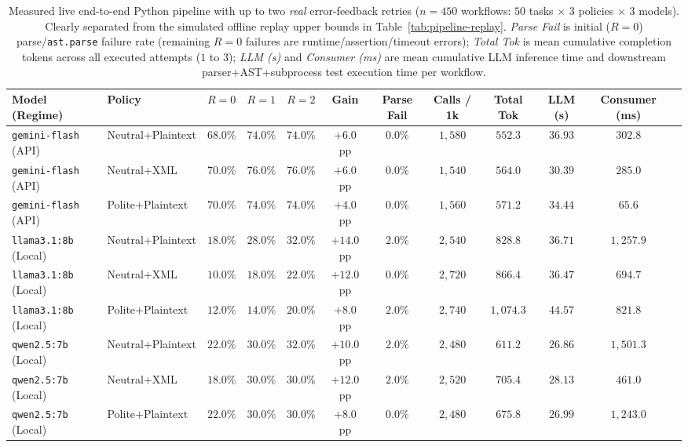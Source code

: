 \documentclass[a4paper,fleqn]{cas-sc}
\begin{document}
\begin{table}[htbp]
\centering
\caption{Measured live end-to-end Python pipeline with up to two \emph{real} error-feedback retries ($n = 450$ workflows: $50$ tasks $\times$ $3$ policies $\times$ $3$ models). Clearly separated from the simulated offline replay upper bounds in Table~\ref{tab:pipeline-replay}. \emph{Parse Fail} is initial ($R=0$) parse/\texttt{ast.parse} failure rate (remaining $R=0$ failures are runtime/assertion/timeout errors); \emph{Total Tok} is mean cumulative completion tokens across all executed attempts ($1$ to $3$); \emph{LLM (s)} and \emph{Consumer (ms)} are mean cumulative LLM inference time and downstream parser+AST+subprocess test execution time per workflow.}\label{tab:live-pipeline-measured}
\footnotesize
\setlength{\tabcolsep}{2.8pt}
\begin{tabular}{@{}llcccccccccc@{}}
\toprule
\textbf{Model (Regime)} & \textbf{Policy} & \textbf{$R=0$} & \textbf{$R=1$} & \textbf{$R=2$} & \textbf{Gain} & \textbf{Parse Fail} & \textbf{Calls / 1k} & \textbf{Total Tok} & \textbf{LLM (s)} & \textbf{Consumer (ms)} \\
\midrule
\texttt{gemini-flash} (API) & Neutral+Plaintext & $68.0\%$ & $74.0\%$ & $74.0\%$ & $+6.0$ pp & $0.0\%$ & $1{,}580$ & $552.3$ & $36.93$ & $302.8$ \\
\texttt{gemini-flash} (API) & Neutral+XML & $70.0\%$ & $76.0\%$ & $76.0\%$ & $+6.0$ pp & $0.0\%$ & $1{,}540$ & $564.0$ & $30.39$ & $285.0$ \\
\texttt{gemini-flash} (API) & Polite+Plaintext & $70.0\%$ & $74.0\%$ & $74.0\%$ & $+4.0$ pp & $0.0\%$ & $1{,}560$ & $571.2$ & $34.44$ & $65.6$ \\
\midrule
\texttt{llama3.1:8b} (Local) & Neutral+Plaintext & $18.0\%$ & $28.0\%$ & $32.0\%$ & $+14.0$ pp & $2.0\%$ & $2{,}540$ & $828.8$ & $36.71$ & $1{,}257.9$ \\
\texttt{llama3.1:8b} (Local) & Neutral+XML & $10.0\%$ & $18.0\%$ & $22.0\%$ & $+12.0$ pp & $0.0\%$ & $2{,}720$ & $866.4$ & $36.47$ & $694.7$ \\
\texttt{llama3.1:8b} (Local) & Polite+Plaintext & $12.0\%$ & $14.0\%$ & $20.0\%$ & $+8.0$ pp & $2.0\%$ & $2{,}740$ & $1{,}074.3$ & $44.57$ & $821.8$ \\
\midrule
\texttt{qwen2.5:7b} (Local) & Neutral+Plaintext & $22.0\%$ & $30.0\%$ & $32.0\%$ & $+10.0$ pp & $2.0\%$ & $2{,}480$ & $611.2$ & $26.86$ & $1{,}501.3$ \\
\texttt{qwen2.5:7b} (Local) & Neutral+XML & $18.0\%$ & $30.0\%$ & $30.0\%$ & $+12.0$ pp & $2.0\%$ & $2{,}520$ & $705.4$ & $28.13$ & $461.0$ \\
\texttt{qwen2.5:7b} (Local) & Polite+Plaintext & $22.0\%$ & $30.0\%$ & $30.0\%$ & $+8.0$ pp & $0.0\%$ & $2{,}480$ & $675.8$ & $26.99$ & $1{,}243.0$ \\
\bottomrule
\end{tabular}
\end{table}
\end{document}
